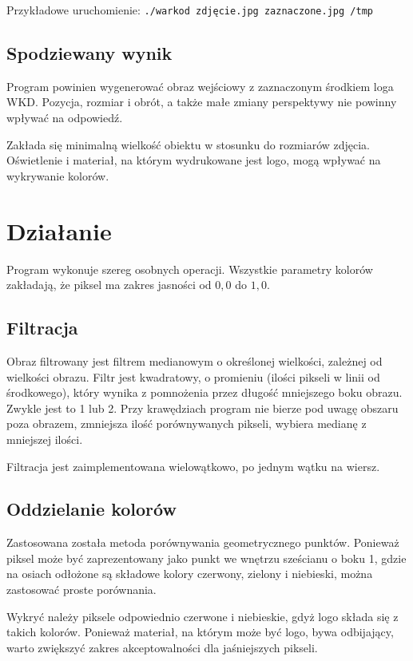 \documentclass[a4paper,12pt]{article}
\begin{document}
			Przykładowe uruchomienie:
			\texttt{./warkod zdjęcie.jpg zaznaczone.jpg /tmp}
			
		\subsection{Spodziewany wynik}
			Program powinien wygenerować obraz wejściowy z zaznaczonym środkiem loga WKD.
			Pozycja, rozmiar i obrót, a także małe zmiany perspektywy nie powinny wpływać na odpowiedź.
			
			Zakłada się minimalną wielkość obiektu w stosunku do rozmiarów zdjęcia.
			Oświetlenie i materiał, na którym wydrukowane jest logo, mogą wpływać na wykrywanie kolorów.
			
	\section{Działanie}
		Program wykonuje szereg osobnych operacji.
		Wszystkie parametry kolorów zakładają, że piksel ma zakres jasności od $0,0$ do $1,0$.
		\subsection{Filtracja}
			Obraz filtrowany jest filtrem medianowym o określonej wielkości, zależnej od wielkości obrazu.
			Filtr jest kwadratowy, o promieniu (ilości pikseli w linii od środkowego), który wynika z pomnożenia przez \medianfilterradius{} długość mniejszego boku obrazu.
			Zwykle jest to 1 lub 2.
			Przy krawędziach program nie bierze pod uwagę obszaru poza obrazem, zmniejsza ilość porównywanych pikseli, wybiera medianę z mniejszej ilości.
			
			Filtracja jest zaimplementowana wielowątkowo, po jednym wątku na wiersz.
			
		\subsection{Oddzielanie kolorów}
			Zastosowana została metoda porównywania geometrycznego punktów. 
			Ponieważ piksel może być zaprezentowany jako punkt we wnętrzu sześcianu o boku 1, gdzie na osiach odłożone są składowe kolory czerwony, zielony i niebieski,
			można zastosować proste porównania.
			
			Wykryć należy piksele odpowiednio czerwone i niebieskie, gdyż logo składa się z takich kolorów.
			Ponieważ materiał, na którym może być logo, bywa odbijający, warto zwiększyć zakres akceptowalności dla jaśniejszych pikseli.
			
\end{document}
